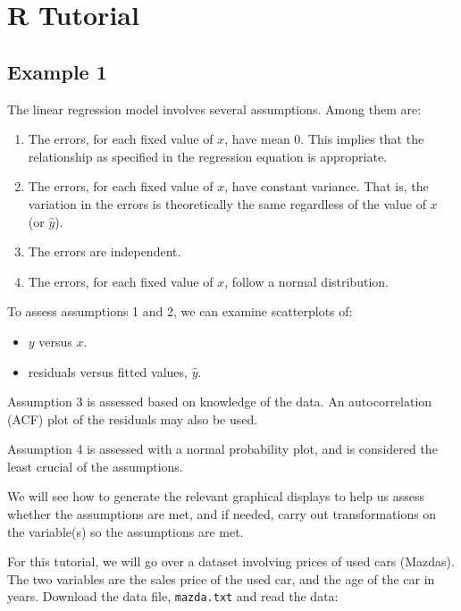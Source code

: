 \documentclass[
]{book}
\providecommand{\tightlist}{%
  \setlength{\itemsep}{0pt}\setlength{\parskip}{0pt}}
\begin{document}
\hypertarget{r-tutorial-2}{%
\section{R Tutorial}\label{r-tutorial-2}}

\hypertarget{example-1}{%
\subsection{Example 1}\label{example-1}}

The linear regression model involves several assumptions. Among them are:

\begin{enumerate}
\def\labelenumi{\arabic{enumi}.}
\tightlist
\item
  The errors, for each fixed value of \(x\), have mean 0. This implies that the relationship as specified in the regression equation is appropriate.
\item
  The errors, for each fixed value of \(x\), have constant variance. That is, the variation in the errors is theoretically the same regardless of the value of \(x\) (or \(\hat{y}\)).
\item
  The errors are independent.
\item
  The errors, for each fixed value of \(x\), follow a normal distribution.
\end{enumerate}

To assess assumptions 1 and 2, we can examine scatterplots of:

\begin{itemize}
\tightlist
\item
  \(y\) versus \(x\).
\item
  residuals versus fitted values, \(\hat{y}\).
\end{itemize}

Assumption 3 is assessed based on knowledge of the data. An autocorrelation (ACF) plot of the residuals may also be used.

Assumption 4 is assessed with a normal probability plot, and is considered the least crucial of the assumptions.

We will see how to generate the relevant graphical displays to help us assess whether the assumptions are met, and if needed, carry out transformations on the variable(s) so the assumptions are met.

For this tutorial, we will go over a dataset involving prices of used cars (Mazdas). The two variables are the sales price of the used car, and the age of the car in years. Download the data file, \texttt{mazda.txt} and read the data:
\end{document}
